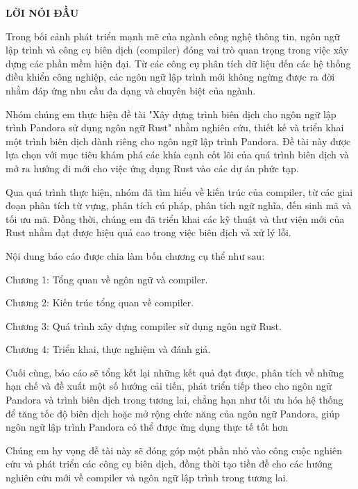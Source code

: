 \begin{center}
    \bf{LỜI NÓI ĐẦU}
\end{center}

Trong bối cảnh phát triển mạnh mẽ của ngành công nghệ thông tin, ngôn ngữ lập trình và công cụ biên dịch (compiler) đóng vai trò quan trọng trong việc xây dựng các phần mềm hiện đại. Từ các công cụ phân tích dữ liệu đến các hệ thống điều khiển công nghiệp, các ngôn ngữ lập trình mới không ngừng được ra đời nhằm đáp ứng nhu cầu đa dạng và chuyên biệt của ngành.

Nhóm chúng em thực hiện đề tài "Xây dựng trình biên dịch cho ngôn ngữ lập trình Pandora sử dụng ngôn ngữ Rust" nhằm nghiên cứu, thiết kế và triển khai một trình biên dịch dành riêng cho ngôn ngữ lập trình Pandora. Đề tài này được lựa chọn với mục tiêu khám phá các khía cạnh cốt lõi của quá trình biên dịch và mở ra hướng đi mới cho việc ứng dụng Rust vào các dự án phức tạp.

Qua quá trình thực hiện, nhóm đã tìm hiểu về kiến trúc của compiler, từ các giai đoạn phân tích từ vựng, phân tích cú pháp, phân tích ngữ nghĩa, đến sinh mã và tối ưu mã. Đồng thời, chúng em đã triển khai các kỹ thuật và thư viện mới của Rust nhằm đạt được hiệu quả cao trong việc biên dịch và xử lý lỗi.

Nội dung báo cáo được chia làm bốn chương cụ thể như sau:

Chương 1: Tổng quan về ngôn ngữ và compiler.

Chương 2: Kiến trúc tổng quan về compiler.

Chương 3: Quá trình xây dựng compiler sử dụng ngôn ngữ Rust.

Chương 4: Triển khai, thực nghiệm và đánh giá.

Cuối cùng, báo cáo sẽ tổng kết lại những kết quả đạt được, phân tích về những
hạn chế và đề xuất một số hướng cải tiến, phát triển tiếp theo cho ngôn ngữ Pandora và trình biên dịch trong
tương lai, chẳng hạn như tối ưu hóa hệ thống để tăng tốc độ biên dịch hoặc mở
rộng chức năng của ngôn ngữ Pandora, giúp ngôn ngữ lập trình Pandora có thể được ứng dụng thực tế tốt hơn

Chúng em hy vọng đề tài này sẽ đóng góp một phần nhỏ vào công cuộc nghiên cứu và phát triển các công cụ biên dịch, đồng thời tạo tiền đề cho các hướng nghiên cứu mới về compiler và ngôn ngữ lập trình trong tương lai.

